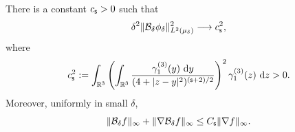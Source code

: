 \documentclass[11pt,reqno]{amsart}
\numberwithin{equation}{section}
\theoremstyle{plain}
\theoremstyle{remark}
\DeclarePairedDelimiter{\norm}{\lVert}{\rVert}
\begin{document}
\begin{lemma}\label{iid:lem:interaction-amplification}
There is a constant $c_{\mathsf{s}}>0$ such that
\begin{equation}\label{iid:eq:interaction-limit}
 \delta^2\norm{\mathcal B_\delta\phi_\delta}_{L^2(\mu_\delta)}^2\longrightarrow c_\s^2,
\end{equation}
where
\begin{equation}\label{iid:eq:c-s}
 c_{\mathsf{s}}^2:=\int_{\mathbb R^3}\left(\int_{\mathbb R^3}
 \frac{\gamma_1^{(3)}(y)\,\,\mathrm d y}{(4+|z-y|^2)^{(\mathsf{s}+2)/2}}\right)^2
 \gamma_1^{(3)}(z)\,\,\mathrm d z>0.
\end{equation}
Moreover, uniformly in small $\delta$,
\begin{equation}\label{iid:eq:B-bounds}
 \norm{\mathcal B_\delta f}_\infty+\norm{\nabla \mathcal B_\delta f}_\infty
 \le C_\s\norm{\nabla f}_\infty.
\end{equation}
\end{lemma}
\end{document}

